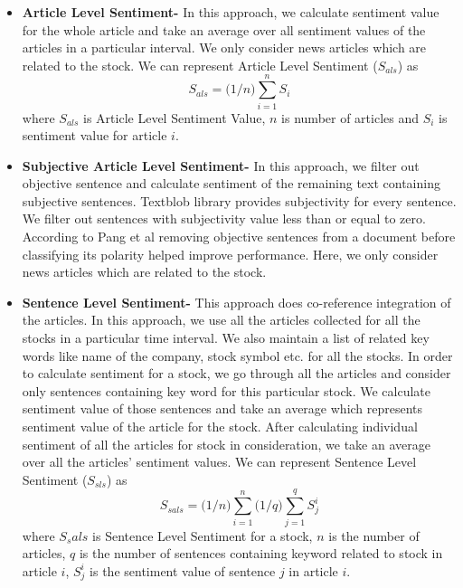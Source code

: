 \documentclass[a4paper,11pt]{article}
\begin{document}
\begin{itemize}

\item \textbf{Article Level Sentiment-} In this approach, we calculate sentiment value for the whole article and take an average over all sentiment values of the articles in a particular interval. We only consider news articles which are related to the stock. We can represent Article Level Sentiment ($S_{als}$) as
\begin{equation}
S_{als} =  \big( 1/n \big)  \sum_{i=1}^n S_{i}
\end{equation}
where $S_{als}$ is Article Level Sentiment Value, $n$ is number of articles and $S_{i}$ is sentiment value for article $i$.

\item \textbf{Subjective Article Level Sentiment-} In this approach, we filter out objective sentence and calculate sentiment of the remaining text containing subjective sentences. Textblob library provides subjectivity for every sentence. We filter out sentences with subjectivity value less than or equal to zero. According to Pang et al \cite{pang} removing objective sentences from a document before classifying its polarity helped improve performance. Here, we only consider news articles which are related to the stock.

\item \textbf{Sentence Level Sentiment-} This approach does co-reference integration of the articles. In this approach, we use all the articles collected for all the stocks in a particular time interval. We also maintain a list of related key words like name of the company, stock symbol etc. for all the stocks. In order to calculate sentiment for a stock, we go through all the articles and consider only sentences containing key word for this particular stock. We calculate sentiment value of those sentences and take an average which represents sentiment value of the article for the stock. After calculating individual sentiment of all the articles for stock in consideration, we take an average over all the articles' sentiment values. We can represent Sentence Level Sentiment ($S_{sls}$) as
\begin{equation}
S_{sals} =  \big( 1/n \big)  \sum_{i=1}^n  \big( 1/q \big) \sum_{j=1}^q S_j^i
\end{equation}
where $S_sals$ is Sentence Level Sentiment for a stock, $n$ is the number of articles, $q$ is the number of sentences containing keyword related to stock in article $i$, $S_j^i$ is the sentiment value of sentence $j$ in article $i$.
\end{itemize}
\end{document}
